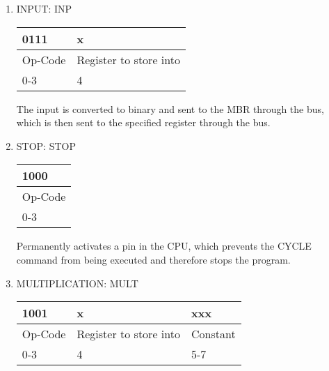 \documentclass{article}
\begin{document}
\begin{enumerate}
\item INPUT: INP\\
  \begin{tabularx}{\textwidth}{|X|X|}
    \hline 0111 & x
    \\ \hline Op-Code & Register to store into
    \\ \hline 0-3 & 4
    \\ \hline
  \end{tabularx}
The input is converted to binary and sent to the MBR through the bus, which is then sent to the specified register through the bus.

\item STOP: STOP\\
  \begin{tabularx}{\textwidth}{|X|}
    \hline 1000
    \\ \hline Op-Code
    \\ \hline 0-3
    \\ \hline
  \end{tabularx}
Permanently activates a pin in the CPU, which prevents the CYCLE command from being executed and therefore stops the program.

\item MULTIPLICATION: MULT\\
  \begin{tabularx}{\textwidth}{|X|X|X|}
    \hline 1001 & x & xxx
    \\ \hline Op-Code & Register to store into & Constant
    \\ \hline 0-3 & 4 & 5-7
    \\ \hline
  \end{tabularx}
  
\end{enumerate}
	
\end{document}
